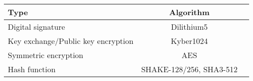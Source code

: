 \begin{tabular}{|l|c|c|}
  \hline
  Type                               & Algorithm               \\
  \hline
  Digital signature                  & Dilithium5              \\
  Key exchange/Public key encryption & Kyber1024               \\
  Symmetric encryption               & AES                     \\
  Hash function                      & SHAKE-128/256, SHA3-512 \\
  \hline
\end{tabular}
